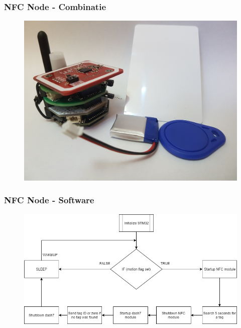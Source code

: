 \begin{frame}[fragile]
\frametitle{NFC Node - Combinatie} 
\begin{figure}
  \centering
  \includegraphics[width=\textwidth]{images/NFC5.jpg}
\end{figure}
\end{frame}

\begin{frame}[fragile]
\frametitle{NFC Node - Software} 
\begin{figure}
  \centering
  \includegraphics[width=\textwidth]{images/NFC6.png}
\end{figure}
\end{frame}

